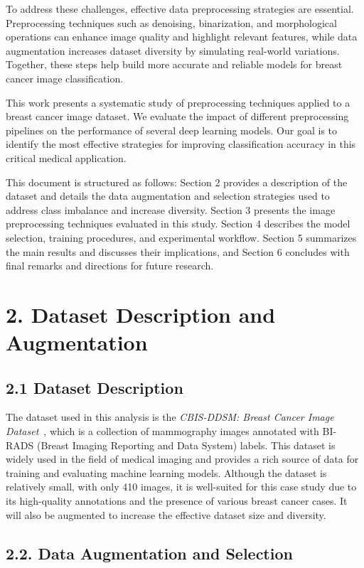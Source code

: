\documentclass[12pt]{article}
\begin{document}
To address these challenges, effective data preprocessing strategies are essential. Preprocessing techniques such as denoising, binarization, and morphological operations can enhance image quality and highlight relevant features, while data augmentation increases dataset diversity by simulating real-world variations. Together, these steps help build more accurate and reliable models for breast cancer image classification.

This work presents a systematic study of preprocessing techniques applied to a breast cancer image dataset. We evaluate the impact of different preprocessing pipelines on the performance of several deep learning models. Our goal is to identify the most effective strategies for improving classification accuracy in this critical medical application.

This document is structured as follows: Section 2 provides a description of the dataset and details the data augmentation and selection strategies used to address class imbalance and increase diversity. Section 3 presents the image preprocessing techniques evaluated in this study. Section 4 describes the model selection, training procedures, and experimental workflow. Section 5 summarizes the main results and discusses their implications, and Section 6 concludes with final remarks and directions for future research.

\section*{2. Dataset Description and Augmentation}

\subsection*{2.1 Dataset Description}

The dataset used in this analysis is the \textit{CBIS-DDSM: Breast Cancer Image Dataset}~\cite{cbis_ddsm}, which is a collection of mammography images annotated with BI-RADS (Breast Imaging Reporting and Data System) labels. This dataset is widely used in the field of medical imaging and provides a rich source of data for training and evaluating machine learning models. Although the dataset is relatively small, with only 410 images, it is well-suited for this case study due to its high-quality annotations and the presence of various breast cancer cases. It will also be augmented to increase the effective dataset size and diversity.

\subsection*{2.2. Data Augmentation and Selection}
\end{document}
